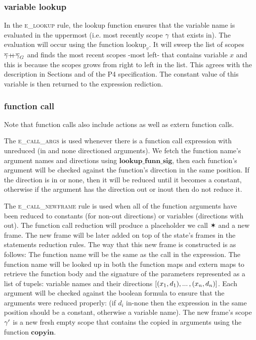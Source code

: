 \documentclass[UTF8]{article}
\begin{document}
\subsubsection*{variable lookup}
In the \textsc{e\_lookup} rule, the lookup function ensures that the variable name \vn{} is evaluated in the uppermost (i.e. most recently scope $\gamma$ that \vn{} exists in). The evaluation will occur using the function $\mathrm{lookup}_v$. It will sweep the list of scopes $\overline{\gamma} {+}\mspace{-8mu}{+} \overline{\gamma}_G$ and finds the most recent scopes -most left- that contains variable $x$ and this is because the scopes grows from right to left in the list. This agrees with the description in Sections  and  of the P4 specification. The constant value of this variable is then returned to the expression rediction.

\begin{figure}[ht!]
    \ottusedrule{\ottdruleeXXlookup{}} 
\end{figure}



\subsubsection*{function call}
Note that function calls also include actions as well as extern function calls.

The \textsc{e\_call\_args} is used whenever there is a function call expression with unreduced (in and none directioned arguments). We fetch the function name's argument names and directions using $\mathbf{lookup\_funn\_sig}$, then each function's argument will be checked against the function's direction in the same position. If the direction is in or none, then it will be reduced until it becomes a constant, otherwise if the argument has the direction out or inout then do not reduce it.

The \textsc{e\_call\_newframe} rule is used when all of the function arguments have been reduced to constants (for non-out directions) or variables (directions with out). The function call reduction will produce a placeholder we call $\varstar$ and a new frame. The new frame will be later added on top of the state's frames in the statements reduction rules. 
The way that this new frame is constructed is as follows: The function name \funn{} will be the same as the call in the expression. The function name \funn{} will be looked up in both the function maps and extern maps to retrieve the function body \stmt{}  and the signature of the parameters represented as a list of tupels: variable names and their directions $ [(x{}_1, d_1) , ... \, , (x{}_n, d_n) ] $. Each argument will be checked against the boolean formula to ensure that the arguments were reduced properly: (if $d_i$ in-none then the expression in the same position should be a constant, otherwise a variable name). The new frame's scope $\gamma'$ is a new fresh empty scope that contains the copied in arguments using the function $\mathbf{copyin}$.
\end{document}

